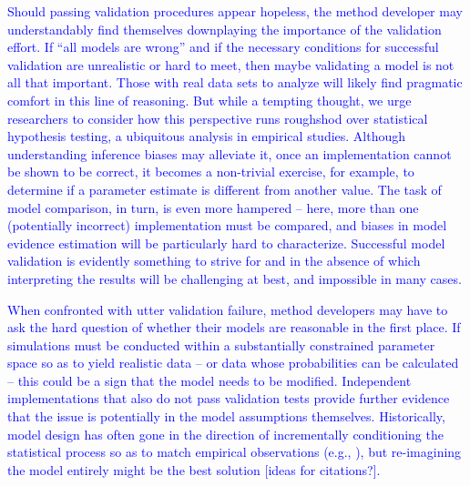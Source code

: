 \documentclass[oneside]{article}
\begin{document}
\textcolor{blue}{Should passing validation procedures appear hopeless, the method developer may understandably find themselves downplaying the importance of the validation effort.
If ``all models are wrong'' and if the necessary conditions for successful validation are unrealistic or hard to meet, then maybe validating a model is not all that important.
Those with real data sets to analyze will likely find pragmatic comfort in this line of reasoning.
But while a tempting thought, we urge researchers to consider how this perspective runs roughshod over statistical hypothesis testing, a ubiquitous analysis in empirical studies.
Although understanding inference biases may alleviate it, once an implementation cannot be shown to be correct, it becomes a non-trivial exercise, for example, to determine if a parameter estimate is different from another value.
The task of model comparison, in turn, is even more hampered -- here, more than one (potentially incorrect) implementation must be compared, and biases in model evidence estimation will be particularly hard to characterize.
Successful model validation is evidently something to strive for and in the absence of which interpreting the results will be challenging at best, and impossible in many cases.}

\textcolor{blue}{When confronted with utter validation failure, method developers may have to ask the hard question of whether their models are reasonable in the first place.
If simulations must be conducted within a substantially constrained parameter space so as to yield realistic data -- or data whose probabilities can be calculated -- this could be a sign that the model needs to be modified. 
Independent implementations that also do not pass validation tests provide further evidence that the issue is potentially in the model assumptions themselves.
Historically, model design has often gone in the direction of incrementally conditioning the statistical process so as to match empirical observations (e.g., \citealp{Gelman1995,Gelman2020}), but re-imagining the model entirely might be the best solution [ideas for citations?].}

\end{document}
